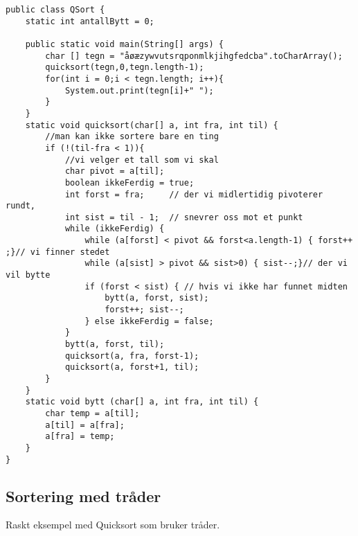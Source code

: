 \documentclass[a4paper,norsk,10pt]{article}
\begin{document}
\begin{verbatim}
public class QSort {
    static int antallBytt = 0;

    public static void main(String[] args) {
        char [] tegn = "åøæzywvutsrqponmlkjihgfedcba".toCharArray();
        quicksort(tegn,0,tegn.length-1);
        for(int i = 0;i < tegn.length; i++){
            System.out.print(tegn[i]+" "); 
        }
    }
    static void quicksort(char[] a, int fra, int til) {
        //man kan ikke sortere bare en ting
        if (!(til-fra < 1)){
            //vi velger et tall som vi skal
            char pivot = a[til];
            boolean ikkeFerdig = true;
            int forst = fra;     // der vi midlertidig pivoterer rundt, 
            int sist = til - 1;  // snevrer oss mot et punkt
            while (ikkeFerdig) {
                while (a[forst] < pivot && forst<a.length-1) { forst++ ;}// vi finner stedet
                while (a[sist] > pivot && sist>0) { sist--;}// der vi vil bytte
                if (forst < sist) { // hvis vi ikke har funnet midten
                    bytt(a, forst, sist);
                    forst++; sist--;
                } else ikkeFerdig = false; 
            }
            bytt(a, forst, til);
            quicksort(a, fra, forst-1);
            quicksort(a, forst+1, til);
        }
    }
    static void bytt (char[] a, int fra, int til) {
        char temp = a[til];
        a[til] = a[fra];
        a[fra] = temp;
    }
}
\end{verbatim}
\subsection{Sortering med tråder}
\label{sec-15.3}

Raskt eksempel med Quicksort som bruker tråder.
\end{document}
